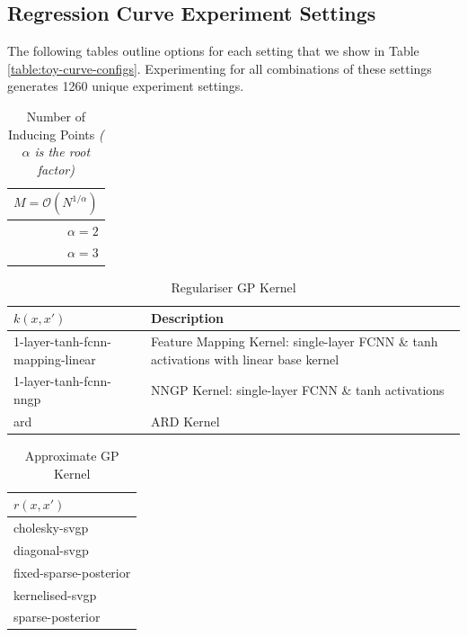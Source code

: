\documentclass{article}
\numberwithin{equation}{section}
\begin{document}
\subsection{Regression Curve Experiment Settings}\label{appendix:configurations}
The following tables outline options for each setting that we show in Table \ref{table:toy-curve-configs}. 
Experimenting for all combinations of these settings generates 1260 unique experiment settings.

\begin{table}[h!]
\tiny
\centering
\begin{tabular}{r}
\toprule
 $M = \mathcal{O}\left(N^{1/\alpha}\right)$ \\
\midrule
                                 $\alpha=2$ \\
                                 $\alpha=3$ \\
\bottomrule
\end{tabular}
\caption{Number of Inducing Points \textit{($\alpha$ is the root factor)}}
\end{table}

\begin{table}[h!]
\tiny
\centering
\begin{tabular}{ll}
\toprule
             $k(x, x')$ & Description\\
\midrule
1-layer-tanh-fcnn-mapping-linear & Feature Mapping Kernel: single-layer FCNN \& tanh activations with linear base kernel\\
          1-layer-tanh-fcnn-nngp &  NNGP Kernel: single-layer FCNN \& tanh activations\\
                            ard & ARD Kernel\\
\bottomrule
\end{tabular}
\caption{Regulariser GP Kernel}
\end{table}

\begin{table}[h!]
\tiny
\centering
\begin{tabular}{l}
\toprule
    $r(x, x')$ \\
\midrule
         cholesky-svgp \\
         diagonal-svgp \\
fixed-sparse-posterior \\
       kernelised-svgp \\
      sparse-posterior \\
\bottomrule
\end{tabular}
\caption{Approximate GP Kernel}
\end{table}
\end{document}
